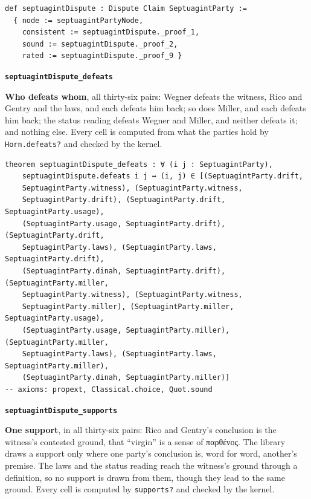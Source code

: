 \documentclass[11pt]{article}
\begin{document}
{\small\begin{verbatim}
def septuagintDispute : Dispute Claim SeptuagintParty :=
  { node := septuagintPartyNode,
    consistent := septuagintDispute._proof_1,
    sound := septuagintDispute._proof_2,
    rated := septuagintDispute._proof_9 }
\end{verbatim}}
\par\medskip\noindent\textbf{\texttt{septuagint\allowbreak{}Dispute\_\allowbreak{}defeats}}\par\nobreak\noindent
\textbf{Who defeats whom}, all thirty-six pairs: Wegner defeats the witness, Rico and Gentry and the laws, and each defeats him back; so does Miller, and each defeats him back; the status reading defeats Wegner and Miller, and neither defeats it; and nothing else. Every cell is computed from what the parties hold by \texttt{Horn.defeats?} and checked by the kernel.

{\small\begin{verbatim}
theorem septuagintDispute_defeats : ∀ (i j : SeptuagintParty),
    septuagintDispute.defeats i j ↔ (i, j) ∈ [(SeptuagintParty.drift,
    SeptuagintParty.witness), (SeptuagintParty.witness,
    SeptuagintParty.drift), (SeptuagintParty.drift, SeptuagintParty.usage),
    (SeptuagintParty.usage, SeptuagintParty.drift), (SeptuagintParty.drift,
    SeptuagintParty.laws), (SeptuagintParty.laws, SeptuagintParty.drift),
    (SeptuagintParty.dinah, SeptuagintParty.drift), (SeptuagintParty.miller,
    SeptuagintParty.witness), (SeptuagintParty.witness,
    SeptuagintParty.miller), (SeptuagintParty.miller, SeptuagintParty.usage),
    (SeptuagintParty.usage, SeptuagintParty.miller), (SeptuagintParty.miller,
    SeptuagintParty.laws), (SeptuagintParty.laws, SeptuagintParty.miller),
    (SeptuagintParty.dinah, SeptuagintParty.miller)]
-- axioms: propext, Classical.choice, Quot.sound
\end{verbatim}}
\par\medskip\noindent\textbf{\texttt{septuagint\allowbreak{}Dispute\_\allowbreak{}supports}}\par\nobreak\noindent
\textbf{One support}, in all thirty-six pairs: Rico and Gentry’s conclusion is the witness’s contested ground, that “virgin” is a sense of παρθένος. The library draws a support only where one party’s conclusion is, word for word, another’s premise. The laws and the status reading reach the witness’s ground through a definition, so no support is drawn from them, though they lead to the same ground. Every cell is computed by \texttt{supports?} and checked by the kernel.
\end{document}
